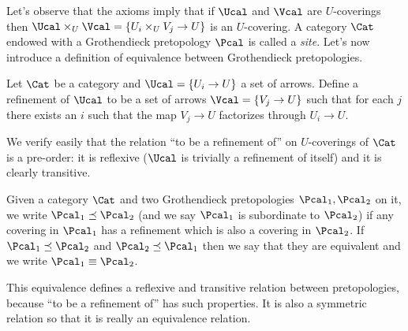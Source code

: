 \documentclass[a4paper]{article}
\begin{document}
            Let's observe that the axioms imply that if $\Ucal$ and $\Vcal$ are $U$-coverings then $\Ucal \times_U \Vcal = \{U_i \times_U V_j \to U\}$ is an $U$-covering. A category $\Cat$ endowed with a Grothendieck pretopology $\Pcal$ is called a \emph{site}.
            Let's now introduce a definition of equivalence between Grothendieck pretopologies.
            \begin{defn}
                Let $\Cat$ be a category and $\Ucal = \{U_i \to U\}$ a set of arrows. Define a refinement of $\Ucal$ to be a set of arrows $\Vcal = \{V_j \to U\}$ such that for each $j$ there exists an $i$ such that the map $V_j \to U$ factorizes through $U_i \to U$.
            \end{defn}
            We verify easily that the relation ``to be a refinement of'' on $U$-coverings of $\Cat$ is a pre-order: it is reflexive ($\Ucal$ is trivially a refinement of itself) and it is clearly transitive.

            \begin{defn}
                \label{defn:equivalent_pretopologies}
                Given a category $\Cat$ and two Grothendieck pretopologies $\Pcal_1, \Pcal_2$ on it, we write $\Pcal_1 \preceq \Pcal_2$ (and we say $\Pcal_1$ is subordinate to $\Pcal_2$) if any covering in $\Pcal_1$ has a refinement which is also a covering in $\Pcal_2$.
                If $\Pcal_1 \preceq \Pcal_2$ and $\Pcal_2 \preceq \Pcal_1$ then we say that they are equivalent and we write $\Pcal_1 \equiv \Pcal_2$.
            \end{defn}

            This equivalence defines a reflexive and transitive relation between pretopologies, because ``to be a refinement of'' has such properties. It is also a symmetric relation so that it is really an equivalence relation.
\end{document}
